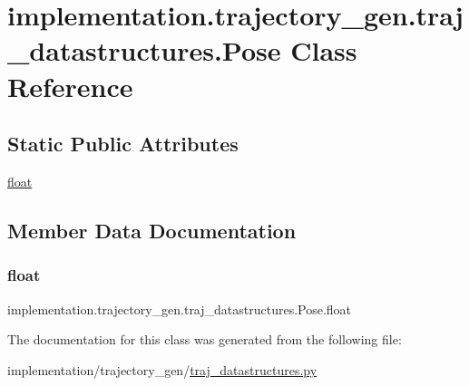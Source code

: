 \hypertarget{classimplementation_1_1trajectory__gen_1_1traj__datastructures_1_1_pose}{}\section{implementation.\+trajectory\+\_\+gen.\+traj\+\_\+datastructures.\+Pose Class Reference}
\label{classimplementation_1_1trajectory__gen_1_1traj__datastructures_1_1_pose}
\subsection*{Static Public Attributes}
\begin{DoxyCompactItemize}
\item 
\hyperlink{classimplementation_1_1trajectory__gen_1_1traj__datastructures_1_1_pose_a0be87a6952f70e9aeccf12de443167bf}{float}
\end{DoxyCompactItemize}


\subsection{Member Data Documentation}
\mbox{\label{classimplementation_1_1trajectory__gen_1_1traj__datastructures_1_1_pose_a0be87a6952f70e9aeccf12de443167bf}} 
\subsubsection{\texorpdfstring{float}{float}}
{\footnotesize\ttfamily implementation.\+trajectory\+\_\+gen.\+traj\+\_\+datastructures.\+Pose.\+float\hspace{0.3cm}{\ttfamily [static]}}



The documentation for this class was generated from the following file\+:\begin{DoxyCompactItemize}
\item 
implementation/trajectory\+\_\+gen/\hyperlink{traj__datastructures_8py}{traj\+\_\+datastructures.\+py}\end{DoxyCompactItemize}
